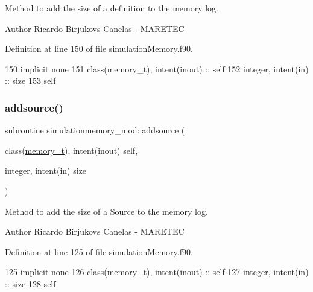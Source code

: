 Method to add the size of a definition to the memory log. 

\begin{DoxyAuthor}{Author}
Ricardo Birjukovs Canelas -\/ M\+A\+R\+E\+T\+EC 
\end{DoxyAuthor}


Definition at line 150 of file simulation\+Memory.\+f90.


\begin{DoxyCode}
150     \textcolor{keywordtype}{implicit none}
151     \textcolor{keywordtype}{class}(memory\_t), \textcolor{keywordtype}{intent(inout)} :: self
152     \textcolor{keywordtype}{integer}, \textcolor{keywordtype}{intent(in)} :: size
153     self%
\end{DoxyCode}
\mbox{\label{namespacesimulationmemory__mod_ae5682757ed7e3e005a1b54e5b44ed8a1}} 
\subsubsection{\texorpdfstring{addsource()}{addsource()}}
{\footnotesize\ttfamily subroutine simulationmemory\+\_\+mod\+::addsource (\begin{DoxyParamCaption}\item[{class(\mbox{\hyperlink{structsimulationmemory__mod_1_1memory__t}{memory\+\_\+t}}), intent(inout)}]{self,  }\item[{integer, intent(in)}]{size }\end{DoxyParamCaption})\hspace{0.3cm}{\ttfamily [private]}}



Method to add the size of a Source to the memory log. 

\begin{DoxyAuthor}{Author}
Ricardo Birjukovs Canelas -\/ M\+A\+R\+E\+T\+EC 
\end{DoxyAuthor}


Definition at line 125 of file simulation\+Memory.\+f90.


\begin{DoxyCode}
125     \textcolor{keywordtype}{implicit none}
126     \textcolor{keywordtype}{class}(memory\_t), \textcolor{keywordtype}{intent(inout)} :: self
127     \textcolor{keywordtype}{integer}, \textcolor{keywordtype}{intent(in)} :: size
128     self%
\end{DoxyCode}
\mbox{\label{namespacesimulationmemory__mod_a3eb0ad61a559664ed4227ca4ad1746af}} 
